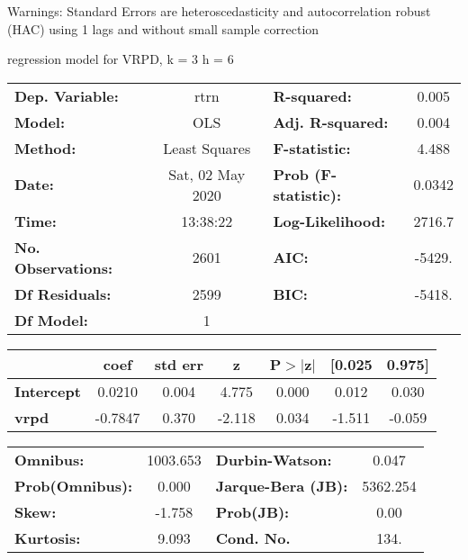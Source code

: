 Warnings: \newline
 [1] Standard Errors are heteroscedasticity and autocorrelation robust (HAC) using 1 lags and without small sample correction\ 

regression model for VRPD, k = 3 h = 6\begin{center}
\begin{tabular}{lclc}
\toprule
\textbf{Dep. Variable:}    &       rtrn       & \textbf{  R-squared:         } &     0.005   \\
\textbf{Model:}            &       OLS        & \textbf{  Adj. R-squared:    } &     0.004   \\
\textbf{Method:}           &  Least Squares   & \textbf{  F-statistic:       } &     4.488   \\
\textbf{Date:}             & Sat, 02 May 2020 & \textbf{  Prob (F-statistic):} &   0.0342    \\
\textbf{Time:}             &     13:38:22     & \textbf{  Log-Likelihood:    } &    2716.7   \\
\textbf{No. Observations:} &        2601      & \textbf{  AIC:               } &    -5429.   \\
\textbf{Df Residuals:}     &        2599      & \textbf{  BIC:               } &    -5418.   \\
\textbf{Df Model:}         &           1      & \textbf{                     } &             \\
\bottomrule
\end{tabular}
\begin{tabular}{lcccccc}
                   & \textbf{coef} & \textbf{std err} & \textbf{z} & \textbf{P$> |$z$|$} & \textbf{[0.025} & \textbf{0.975]}  \\
\midrule
\textbf{Intercept} &       0.0210  &        0.004     &     4.775  &         0.000        &        0.012    &        0.030     \\
\textbf{vrpd}      &      -0.7847  &        0.370     &    -2.118  &         0.034        &       -1.511    &       -0.059     \\
\bottomrule
\end{tabular}
\begin{tabular}{lclc}
\textbf{Omnibus:}       & 1003.653 & \textbf{  Durbin-Watson:     } &    0.047  \\
\textbf{Prob(Omnibus):} &   0.000  & \textbf{  Jarque-Bera (JB):  } & 5362.254  \\
\textbf{Skew:}          &  -1.758  & \textbf{  Prob(JB):          } &     0.00  \\
\textbf{Kurtosis:}      &   9.093  & \textbf{  Cond. No.          } &     134.  \\
\bottomrule
\end{tabular}
\end{center}

